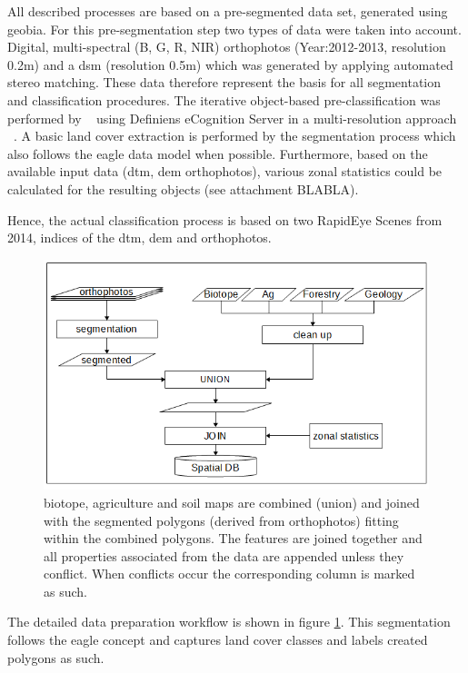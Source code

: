 \documentclass[authoryear,review,12pt,number]{elsarticle}
\begin{document}
All described processes are based on a pre-segmented data set, generated using
\gls{geobia}. For this pre-segmentation step two types of data were taken into
account. Digital, multi-spectral (B, G, R, NIR) orthophotos (Year:2012-2013,
resolution 0.2m) and a \gls{dsm} (resolution 0.5m) which was generated by applying
automated stereo matching. These data therefore represent the basis for all
segmentation and classification procedures. 
The iterative object-based pre-classification was performed by
~\cite{Tintrup2015} using Definiens eCognition Server in a multi-resolution
approach ~\citep{baatz2001ecognition}. A basic land cover extraction is performed by the
segmentation process which also follows the \gls{eagle} data model when
possible. Furthermore, based on the available input data (\gls{dtm}, \gls{dem}
orthophotos), various zonal statistics could be calculated for the resulting
objects (see attachment BLABLA).




Hence, the actual classification
process is based on two RapidEye Scenes from 2014,
indices of the \gls{dtm}, \gls{dem} and orthophotos.

\begin{figure} \includegraphics[width=1\textwidth]{diagrams/pre_processing.png}
    \caption{biotope, agriculture and soil maps are combined 
    (union) and joined with the segmented polygons (derived from 
    orthophotos) fitting within the combined polygons. The features are joined 
    together and all properties associated from the data are appended unless 
    they conflict. When conflicts occur the corresponding column is marked as 
    such.\label{fig:pre-processing}}
\end{figure}
 The detailed data preparation workflow is shown in figure
\ref{fig:pre-processing}. This segmentation follows the \gls{eagle} concept and
captures land cover classes and labels created polygons as such.
\end{document}
